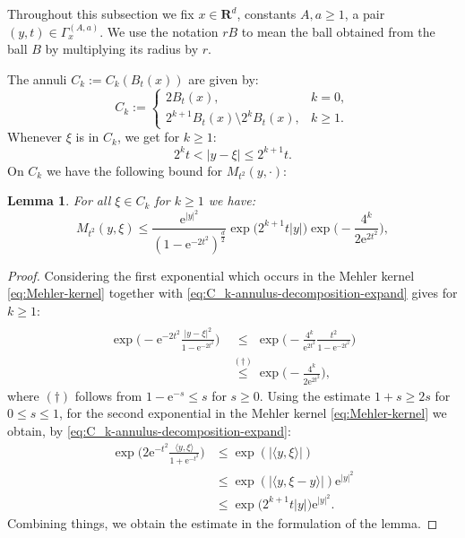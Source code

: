 \documentclass[preprint,12pt]{elsarticle}
\newtheorem{lemma}{Lemma}
\theoremstyle{remark}
\newcommand{\la}{\langle}
\newcommand{\ra}{\rangle}
\renewcommand{\leq}{\leqslant}
\renewcommand{\geq}{\geqslant}
\newcommand{\R}{\mathbf R}
\newcommand{\e}{\mathrm{e}} %
\begin{document}
Throughout this subsection we fix $x \in \R^d$, constants $A, a \geq 1$, a pair
$(y,t) \in \Gamma_x^{(A, a)}$. We use the notation $rB$ to mean the ball obtained
from the ball $B$ by multiplying its radius by $r$.

The annuli $C_k := C_k(B_t(x))$ are given by:
\begin{equation}
  \label{eq:C_k-annulus-decomposition}
  C_k :=
  \begin{cases}
   2B_t(x), &k = 0,\\
   2^{k + 1} B_t(x) \setminus 2^k B_t(x), &k \geq 1.
  \end{cases}
\end{equation}
Whenever $\xi$ is in $C_k$, we get for $k
\geq 1$:
\begin{equation}
  \label{eq:C_k-annulus-decomposition-expand}
  2^k t < |y - \xi| \leq 2^{k + 1} t.
\end{equation}
On $C_k$ we have the following bound for $M_{t^2}(y,\cdot)$:
\begin{lemma}\label{lem:On-diagonal-kernel-estimates-on-Ck}
  For all $\xi \in C_k$ for $k \geq 1$ we have:
  \begin{equation}
    M_{t^2}(y, \xi) \leq \frac{\e^{|y|^2}}{(1 - \e^{-2t^2})^{\frac{d}2}}
    \exp\bigl(2^{k +  1} t |y| \bigr) \exp\Big(-\frac{4^k}{2 \e^{2 t^2}} \Bigr),
  \end{equation}
\end{lemma}
\begin{proof}
  Considering the first exponential which occurs in the Mehler kernel
  \eqref{eq:Mehler-kernel} together with
  \eqref{eq:C_k-annulus-decomposition-expand} gives for $k \geq 1$:
  \begin{align*}
    \exp\biggl(-\e^{-2t^2} \frac{|y - \xi|^2}{1 - \e^{-2t^2}} \biggr)
    &\overset{\phantom{(\dagger)}}{\leq} \exp\biggl(-\frac{4^k}{\e^{2t^2}}
    \frac{t^2}{1 - \e^{-2t^2}} \biggr)\\
    &\overset{(\dagger)}{\leq} \exp\biggl(-\frac{4^k}{2 \e^{2t^2}} \biggr),
  \end{align*}
  where $(\dagger)$ follows from $1 - \e^{-s} \leq s$ for $s \geq 0$. Using the
  estimate $1 + s \geq 2s$ for $0 \leq s \leq 1$, for the second exponential in
  the Mehler kernel \eqref{eq:Mehler-kernel} we obtain, by
  \eqref{eq:C_k-annulus-decomposition-expand}:
  \begin{align*}
    \exp\biggl(2\e^{-t^2} \frac{\la y, \xi \ra}{1 + \e^{- t^2}} \biggr)
    & \leq \exp(|\la y, \xi \ra|)\\
    & \leq \exp(|\langle y, \xi-y\rangle|) \e^{|y|^2}\\
    & \leq \exp\bigl(2^{k + 1} t |y| \bigr) \e^{|y|^2}.
  \end{align*}
  Combining things, we obtain the estimate in the formulation of the lemma.
\end{proof}
\end{document}
